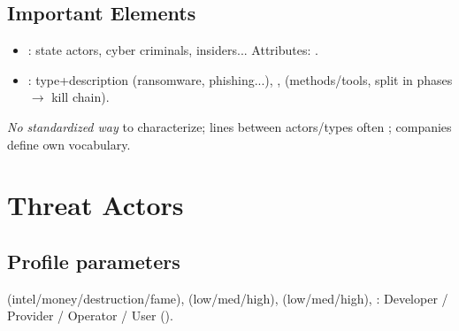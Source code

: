 \subsection{Important Elements}
\begin{itemize}
\item {}: state actors, cyber criminals, insiders... Attributes: .
\item {}: type+description (ransomware, phishing...), ,  (methods/tools, split in phases $\to$ kill chain).
\end{itemize}
\textit{No standardized way} to characterize; lines between actors/types often ; companies define own vocabulary.

\section{Threat Actors}

\subsection{Profile parameters}
 (intel/money/destruction/fame),  (low/med/high),  (low/med/high), : Developer / Provider / Operator / User ().

